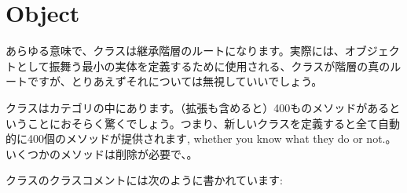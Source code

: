 \documentclass[a4paper,10pt,twoside]{book}
\begin{document}
\section{Object}
あらゆる意味で、クラスは継承階層のルートになります。実際には、オブジェクトとして振舞う最小の実体を定義するために使用される、クラスが階層の真のルートですが、とりあえずそれについては無視していいでしょう。

クラスはカテゴリの中にあります。（拡張も含めると）400ものメソッドがあるということにおそらく驚くでしょう。つまり、新しいクラスを定義すると全て自動的に400個のメソッドが提供されます, whether you know what they do or not.。いくつかのメソッドは削除が必要で、。

クラスのクラスコメントには次のように書かれています:
\end{document}
